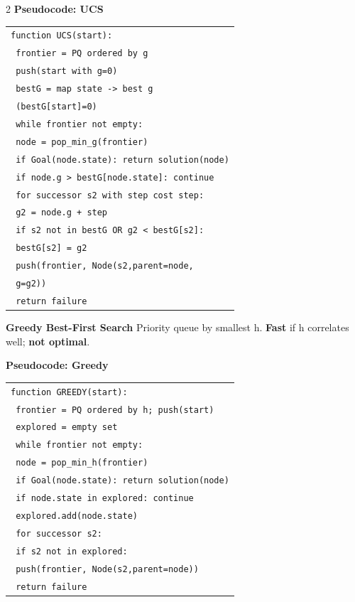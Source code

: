 \documentclass[10pt]{article}
\begin{document}
\begin{multicols*}{2}
\textbf{Pseudocode: UCS}
\begin{tabular}{@{}l@{}}
\texttt{function UCS(start):}\\
\texttt{ frontier = PQ ordered by g}\\
\texttt{ push(start with g=0)}\\
\texttt{ bestG = map state -> best g}\\
\texttt{ (bestG[start]=0)}\\
\texttt{ while frontier not empty:}\\
\texttt{  node = pop\_min\_g(frontier)}\\
\texttt{  if Goal(node.state): return solution(node)}\\
\texttt{  if node.g > bestG[node.state]: continue}\\
\texttt{  for successor s2 with step cost step:}\\
\texttt{   g2 = node.g + step}\\
\texttt{   if s2 not in bestG OR g2 < bestG[s2]:}\\
\texttt{    bestG[s2] = g2}\\
\texttt{    push(frontier, Node(s2,parent=node,}\\
\texttt{     g=g2))}\\
\texttt{ return failure}
\end{tabular}

\textbf{Greedy Best-First Search}\newline
Priority queue by smallest h. \textbf{Fast} if h correlates well; \textbf{not optimal}.

\textbf{Pseudocode: Greedy}
\begin{tabular}{@{}l@{}}
\texttt{function GREEDY(start):}\\
\texttt{ frontier = PQ ordered by h; push(start)}\\
\texttt{ explored = empty set}\\
\texttt{ while frontier not empty:}\\
\texttt{  node = pop\_min\_h(frontier)}\\
\texttt{  if Goal(node.state): return solution(node)}\\
\texttt{  if node.state in explored: continue}\\
\texttt{  explored.add(node.state)}\\
\texttt{  for successor s2:}\\
\texttt{   if s2 not in explored:}\\
\texttt{    push(frontier, Node(s2,parent=node))}\\
\texttt{ return failure}
\end{tabular}


\end{multicols*}
\end{document}
